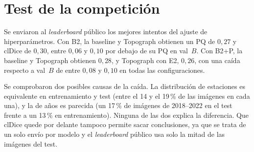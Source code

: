 \section{Test de la competición}
\label{sec:anx-test}

Se enviaron al \emph{leaderboard} público los mejores intentos del ajuste
de hiperparámetros. Con B2, la baseline y Topograph obtienen un PQ de
$0{,}27$ y clDice de $0{,}30$, entre $0{,}06$ y $0{,}10$ por debajo de
su PQ en val~$B$. Con B2+P, la baseline y Topograph obtienen $0{,}28$,
y Topograph con E2, $0{,}26$, con una caída respecto a val~$B$ de entre
$0{,}08$ y $0{,}10$ en todas las configuraciones.

Se comprobaron dos posibles causas de la caída. La distribución de
estaciones es equivalente en entrenamiento y test (entre el 14 y el
19\,\% de las imágenes en cada una), y la de años es parecida (un
17\,\% de imágenes de 2018--2022 en el test frente a un 13\,\% en
entrenamiento). Ninguna de las dos explica la diferencia. Que clDice
quede por delante tampoco permite sacar conclusiones, ya que se trata de
un solo envío por modelo y el \emph{leaderboard} público usa solo la
mitad de las imágenes del test.
